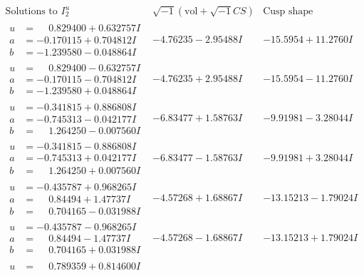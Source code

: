\documentclass[1p]{elsarticle_modified}
\theoremstyle{definition}
\newcommand{\I}{\sqrt{-1}}
\begin{document}
$$\begin{array}{c|c|c}  
\text{Solutions to }I^u_{2}& \I (\text{vol} + \sqrt{-1}CS) & \text{Cusp shape}\\
 \hline 
\begin{aligned}
u &= \phantom{-}0.829400 + 0.632757 I \\
a &= -0.170115 + 0.704812 I \\
b &= -1.239580 - 0.048864 I\end{aligned}
 & -4.76235 - 2.95488 I & -15.5954 + 11.2760 I \\ \hline\begin{aligned}
u &= \phantom{-}0.829400 - 0.632757 I \\
a &= -0.170115 - 0.704812 I \\
b &= -1.239580 + 0.048864 I\end{aligned}
 & -4.76235 + 2.95488 I & -15.5954 - 11.2760 I \\ \hline\begin{aligned}
u &= -0.341815 + 0.886808 I \\
a &= -0.745313 - 0.042177 I \\
b &= \phantom{-}1.264250 - 0.007560 I\end{aligned}
 & -6.83477 + 1.58763 I & -9.91981 - 3.28044 I \\ \hline\begin{aligned}
u &= -0.341815 - 0.886808 I \\
a &= -0.745313 + 0.042177 I \\
b &= \phantom{-}1.264250 + 0.007560 I\end{aligned}
 & -6.83477 - 1.58763 I & -9.91981 + 3.28044 I \\ \hline\begin{aligned}
u &= -0.435787 + 0.968265 I \\
a &= \phantom{-}0.84494 + 1.47737 I \\
b &= \phantom{-}0.704165 - 0.031988 I\end{aligned}
 & -4.57268 + 1.68867 I & -13.15213 - 1.79024 I \\ \hline\begin{aligned}
u &= -0.435787 - 0.968265 I \\
a &= \phantom{-}0.84494 - 1.47737 I \\
b &= \phantom{-}0.704165 + 0.031988 I\end{aligned}
 & -4.57268 - 1.68867 I & -13.15213 + 1.79024 I \\ \hline\begin{aligned}
u &= \phantom{-}0.789359 + 0.814600 I \\

\end{aligned}
\end{array}$$
\end{document}
